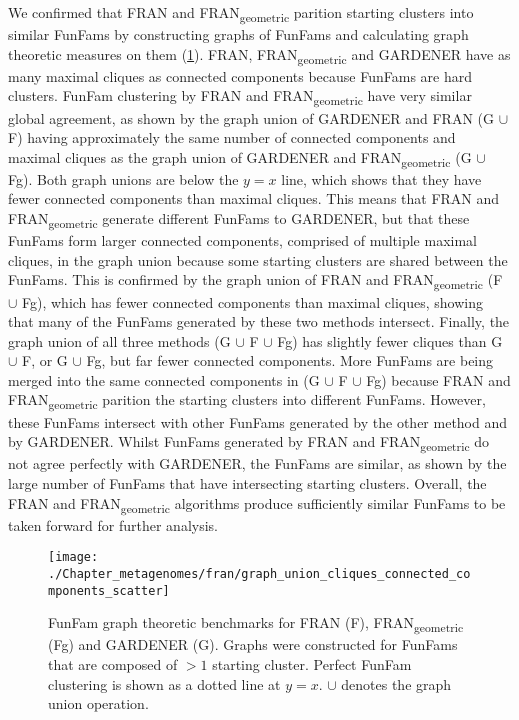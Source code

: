 We confirmed that FRAN and FRAN\textsubscript{geometric} parition starting clusters into similar FunFams by constructing graphs of FunFams and calculating graph theoretic measures on them (\ref{fig:fran-graph}).
FRAN, FRAN\textsubscript{geometric} and GARDENER have as many maximal cliques as connected components because FunFams are hard clusters.
FunFam clustering by FRAN and FRAN\textsubscript{geometric} have very similar global agreement, as shown by
the graph union of GARDENER and FRAN (G $\cup$ F) having approximately the same number of connected components and maximal cliques as the graph union of GARDENER and FRAN\textsubscript{geometric} (G $\cup$ Fg).
Both graph unions are below the $y = x$ line, which shows that they have fewer connected components than maximal cliques.
This means that FRAN and FRAN\textsubscript{geometric} generate different FunFams to GARDENER, but that these FunFams form larger connected components, comprised of multiple maximal cliques, in the graph union because some starting clusters are shared between the FunFams.
This is confirmed by the graph union of FRAN and FRAN\textsubscript{geometric} (F $\cup$ Fg), which has fewer connected components than maximal cliques, showing that many of the FunFams generated by these two methods intersect.
Finally, the graph union of all three methods (G $\cup$ F $\cup$ Fg) has slightly fewer cliques than G $\cup$ F, or G $\cup$ Fg, but far fewer connected components.
More FunFams are being merged into the same connected components in (G $\cup$ F $\cup$ Fg) because FRAN and FRAN\textsubscript{geometric} parition the starting clusters into different FunFams.
However, these FunFams intersect with other FunFams generated by the other method and by GARDENER.
Whilst FunFams generated by FRAN and FRAN\textsubscript{geometric} do not agree perfectly with GARDENER, the FunFams are similar, as shown by the large number of FunFams that have intersecting starting clusters.
Overall, the FRAN and FRAN\textsubscript{geometric} algorithms produce sufficiently similar FunFams to be taken forward for further analysis.

\begin{figure}[!hbt]
    \centering
    \texttt{[image: ./Chapter\_metagenomes/fran/graph\_union\_cliques\_connected\_components\_scatter]}
    \caption{%
        FunFam graph theoretic benchmarks for FRAN (F), FRAN\textsubscript{geometric} (Fg) and GARDENER (G).
        Graphs were constructed for FunFams that are composed of $> 1$ starting cluster.
        Perfect FunFam clustering is shown as a dotted line at $y = x$.
        $\cup$ denotes the graph union operation.
    }
    \label{fig:fran-graph}
\end{figure}


